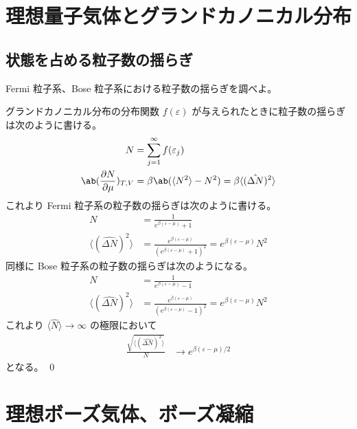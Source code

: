 \documentclass[uplatex,dvipdfmx,a4paper,11pt]{jlreq}
\makeatletter
\numberwithin{equation}{section}
\theoremstyle{definition}
\renewenvironment{proof}[1][\proofname]{\par
  \normalfont
  \topsep6\p@\@plus6\p@ \trivlist
  \item[\hskip\labelsep{\bfseries #1}\@addpunct{\bfseries}]\ignorespaces\quad\par
}{%
  \qed\endtrivlist\@endpefalse
}
\renewcommand\proofname{証明}
\makeatother
\begin{document}
\section{理想量子気体とグランドカノニカル分布}
\setcounter{subsection}{5}
\subsection{状態を占める粒子数の揺らぎ}
\begin{problem}
Fermi 粒子系、Bose 粒子系における粒子数の揺らぎを調べよ。
\end{problem}
\begin{proof}
  グランドカノニカル分布の分布関数 $f(\varepsilon)$ が与えられたときに粒子数の揺らぎは次のように書ける。
  \begin{align}
    N                         & = \sum_{j=1}^{\infty}f(\varepsilon_j)                                        \\
    \ab(\diffp{N}{\mu})_{T,V} & = \beta\ab(\langle N^2\rangle - N^2) = \beta\langle(\hat{\Delta N})^2\rangle
  \end{align}
  これより Fermi 粒子系の粒子数の揺らぎは次のように書ける。
  \begin{align}
    N                                & = \frac{1}{e^{\beta(\varepsilon - \mu)} + 1}                                                                  \\
    \langle(\hat{\Delta N})^2\rangle & = \frac{e^{\beta(\varepsilon - \mu)}}{(e^{\beta(\varepsilon - \mu)} + 1)^2} = e^{\beta(\varepsilon - \mu)}N^2
  \end{align}
  同様に Bose 粒子系の粒子数の揺らぎは次のようになる。
  \begin{align}
    N                                & = \frac{1}{e^{\beta(\varepsilon - \mu)} - 1}                                                                  \\
    \langle(\hat{\Delta N})^2\rangle & = \frac{e^{\beta(\varepsilon - \mu)}}{(e^{\beta(\varepsilon - \mu)} - 1)^2} = e^{\beta(\varepsilon - \mu)}N^2
  \end{align}
  これより $\langle\hat{N}\rangle\to \infty$ の極限において
  \begin{align}
    \frac{\sqrt{\langle(\hat{\Delta N})^2\rangle}}{N} & \to e^{\beta(\varepsilon - \mu)/2}
  \end{align}
  となる。
\end{proof}

\section{理想ボーズ気体、ボーズ凝縮}
\end{document}
